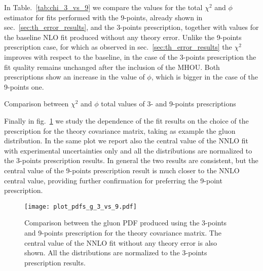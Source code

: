 %
In Table.~\ref{tab:chi_3_vs_9} we compare the values for the total $\chi^2$ and $\phi$ estimator for fits performed with the 9-points,
already shown in sec.~\ref{sec:th_error_results}, and the 3-points
prescription, together with values for the baseline NLO fit produced without any theory error.
Unlike the 9-points prescription case, for which as observed in sec.~\ref{sec:th_error_results}
the $\chi^2$ improves with respect to the baseline,
in the case of the 3-points prescription the fit quality remains unchanged after the inclusion of the MHOU.
Both prescriptions show an increase in the value of $\phi$, which is bigger in the case of the 9-points one.

\begin{table}[ht!]
	\centering
	\small
	
        \vspace{3mm}
	\caption{Comparison between $\chi^2$ and $\phi$ total values of 3- and 9-points prescriptions}
	\label{tab:chi_3_vs_9}
\end{table}

%
Finally in fig.~\ref{fig:pdfs_plots_th_err_3_vs_9} we study the dependence of the fit results on the choice of the prescription
for the theory covariance matrix, taking as example the gluon distribution. In the same plot we report also the central value of
the NNLO fit with experimental uncertainties only and all the distributions are normalized to the 3-points prescription results.
In general the two results are consistent, but the central value of the 9-points prescription result is much closer 
to the NNLO central value, providing further confirmation for preferring the 9-point prescription.

\begin{figure}[t!]
    \begin{center}
        \texttt{[image: plot\_pdfs\_g\_3\_vs\_9.pdf]}
        \caption{Comparison between the gluon PDF produced using the 3-points and 9-points prescription
        for the theory covariance matrix. The central value of the NNLO fit without any theory error is also shown.
        All the distributions are normalized to the 3-points prescription results.} 
        \label{fig:pdfs_plots_th_err_3_vs_9} 
    \end{center}
\end{figure}